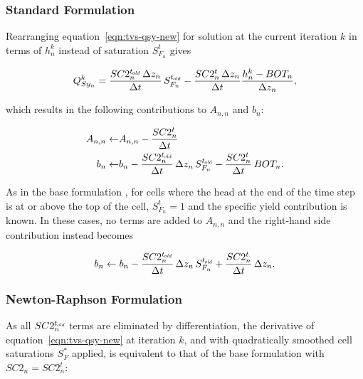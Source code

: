 \subsubsection{Standard Formulation}

Rearranging equation~\ref{eqn:tvs-qsy-new} for solution at the current iteration $k$ in terms of $h_n^k$ instead of saturation $S_{F_n}^t$ gives

\begin{equation}
	\label{eqn:tvs-qsy-new-k}
	Q_{Sy_n}^k = \frac{SC2_n^{t_\mathit{\kern -0.07em old}} \, \Delta z_n}{\Delta t} \, S_{F_n}^{t_\mathit{\kern -0.07em old}} - \frac{SC2_n^t \, \Delta z_n}{\Delta t} \frac{h_n^k - BOT_n}{\Delta z_n} ,
\end{equation}

\noindent which results in the following contributions to $A_{n,n}$ and $b_n$:

\begin{equation}
	\label{eqn:tvs-sy-Ab-std}
	\begin{aligned}
		A_{n,n} \leftarrow & A_{n,n} - \frac{SC2_n^t}{\Delta t} \\
		b_n \leftarrow & b_n - \frac{SC2_n^{t_\mathit{\kern -0.07em old}}}{\Delta t} \, \Delta z_n \, S_{F_n}^{t_\mathit{\kern -0.07em old}} - \frac{SC2_n^t}{\Delta t} \, BOT_n .
	\end{aligned}
\end{equation}

\noindent As in the base formulation \citep[Chapter 5]{modflow6gwf}, for cells where the head at the end of the time step is at or above the top of the cell, $S_{F_n}^t = 1$ and the specific yield contribution is known. In these cases, no terms are added to $A_{n,n}$ and the right-hand side contribution instead becomes

\begin{equation}
	\label{eqn:tvs-sy-b-fullsat}
	b_n \leftarrow b_n - \frac{SC2_n^{t_\mathit{\kern -0.07em old}}}{\Delta t} \, \Delta z_n \, S_{F_n}^{t_\mathit{\kern -0.07em old}} + \frac{SC2_n^t}{\Delta t} \, \Delta z_n .
\end{equation}


\subsubsection{Newton-Raphson Formulation}

As all $SC2_n^{t_\mathit{\kern -0.07em old}}$ terms are eliminated by differentiation, the derivative of equation~\ref{eqn:tvs-qsy-new} at iteration $k$, and with quadratically smoothed cell saturations $S_F^*$ applied, is equivalent to that of the base formulation \citep[eq. 5--14]{modflow6gwf} with $SC2_n = SC2_n^t$:

